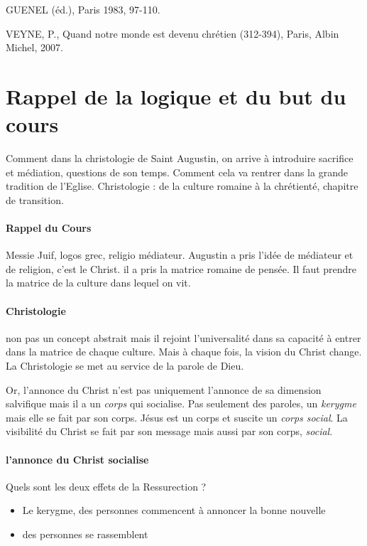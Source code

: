 GUENEL (éd.), Paris 1983, 97-110. 

VEYNE, P., Quand notre monde est devenu chrétien (312-394), Paris, Albin Michel, 2007. 

\section{Rappel de la logique et du but du cours}

Comment dans la christologie de Saint Augustin, on arrive à introduire sacrifice et médiation, questions de son temps. Comment cela va rentrer dans la grande tradition de l'Eglise.
Christologie : de la culture romaine à la chrétienté, chapitre de transition.

\paragraph{Rappel du Cours} Messie Juif, logos grec, religio médiateur. Augustin a pris l'idée de médiateur et de religion, c'est le Christ. il a pris la matrice romaine de pensée. Il faut prendre la matrice de la culture dans lequel on vit.

\paragraph{Christologie} non pas un concept abstrait mais il rejoint l'universalité dans sa capacité à entrer dans la matrice de chaque culture. Mais à chaque fois, la vision du Christ change. La Christologie se met au service de la parole de Dieu.

Or, l'annonce du Christ n'est pas uniquement l'annonce de sa dimension salvifique mais il a un \textit{corps } qui socialise. Pas seulement des paroles, un \textit{kerygme} mais elle se fait par son corps.
Jésus est un corps et suscite un \textit{corps social}. La visibilité du Christ se fait par son message mais aussi par son corps, \textit{social}.

\paragraph{l'annonce du Christ socialise}
Quels sont les deux effets de la Ressurection ? 
\begin{itemize}
    \item Le kerygme, des personnes commencent à annoncer la bonne nouvelle
    \item des personnes se rassemblent
\end{itemize}

